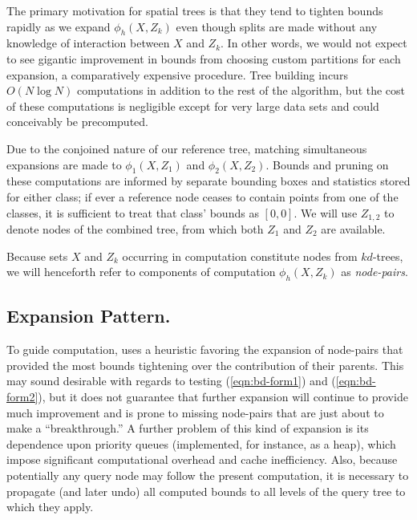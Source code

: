 \documentclass[twoside,leqno,twocolumn]{article}
\begin{document}
The primary motivation for spatial trees is that they tend to tighten
bounds rapidly as we expand $\phi_h(X,Z_k)$ even though splits are
made without any knowledge of interaction between $X$ and $Z_k$.  In
other words, we would not expect to see gigantic improvement in bounds
from choosing custom partitions for each expansion, a comparatively
expensive procedure.  Tree building incurs $O(N \log N)$ computations
in addition to the rest of the algorithm, but the cost of these
computations is negligible except for very large data sets and could
conceivably be precomputed.

Due to the conjoined nature of our reference tree, matching
simultaneous expansions are made to $\phi_1(X,Z_1)$ and
$\phi_2(X,Z_2)$.  Bounds and pruning on these computations are
informed by separate bounding boxes and statistics stored for either
class; if ever a reference node ceases to contain points from one of
the classes, it is sufficient to treat that class' bounds as $[0,0]$.
We will use $Z_{1,2}$ to denote nodes of the combined tree, from which
both $Z_1$ and $Z_2$ are available.

Because sets $X$ and $Z_k$ occurring in computation constitute nodes
from $kd$-trees, we will henceforth refer to components of computation
$\phi_h(X,Z_k)$ as {\em node-pairs}.

\subsection{Expansion Pattern.}
To guide computation, \cite{nbc-compstat} uses a heuristic favoring the
expansion of node-pairs that provided the most bounds tightening over
the contribution of their parents.  This may sound desirable with
regards to testing (\ref{eqn:bd-form1}) and (\ref{eqn:bd-form2}), but
it does not guarantee that further expansion will continue to provide
much improvement and is prone to missing node-pairs that are just
about to make a ``breakthrough.''  A further problem of this kind of
expansion is its dependence upon priority queues (implemented, for
instance, as a heap), which impose significant computational overhead
and cache inefficiency.  Also, because potentially any query node may
follow the present computation, it is necessary to propagate (and
later undo) all computed bounds to all levels of the query tree to
which they apply.
\end{document}
